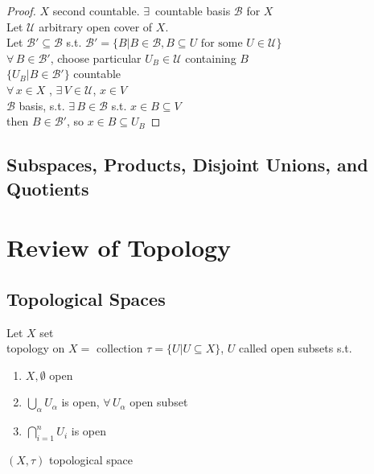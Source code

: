 \documentclass[11pt]{amsart}
\theoremstyle{definition}
\begin{document}
\begin{proof}
  $X$ second countable. $\exists \, $ countable basis $\mathcal{B}$ for $X$ \\
Let $\mathcal{U}$ arbitrary open cover of $X$. \\
Let $\mathcal{B}' \subseteq \mathcal{B}$ s.t. $\mathcal{B}' = \lbrace  B | B \in \mathcal{B}, B\subseteq U \text{ for some } U \in \mathcal{U} \rbrace$ \\

$\forall \, B \in \mathcal{B}'$, choose particular $U_B \in \mathcal{U}$ containing $B$ \\

$\lbrace U_B | B \in \mathcal{B}'\rbrace$ countable \\

$\forall \, x \in X$ , $\exists \, V \in \mathcal{U}$, $x\in V$ \\
$\mathcal{B} $ basis, s.t. $\exists \, B \in \mathcal{B}$ s.t. $x\in B \subseteq V$ \\
then $B \in \mathcal{B}'$, so $x\in B \subseteq U_B$
\end{proof}

\subsection*{Subspaces, Products, Disjoint Unions, and Quotients }


\section*{Review of Topology}

\subsection*{Topological Spaces}

Let $X$ set \\
topology on $X = $ collection $\tau = \lbrace U | U \subseteq X \rbrace$, $U$ called open subsets s.t.
\begin{enumerate}
\item[(i)] $X, \emptyset$ open
\item[(ii)] $\bigcup_{\alpha} U_{\alpha}$ is open, $\forall \, U_{\alpha}$ open subset
\item[(iii)] $\bigcap_{i=1}^n U_i$ is open
\end{enumerate}

$(X,\tau)$ topological space
\end{document}
